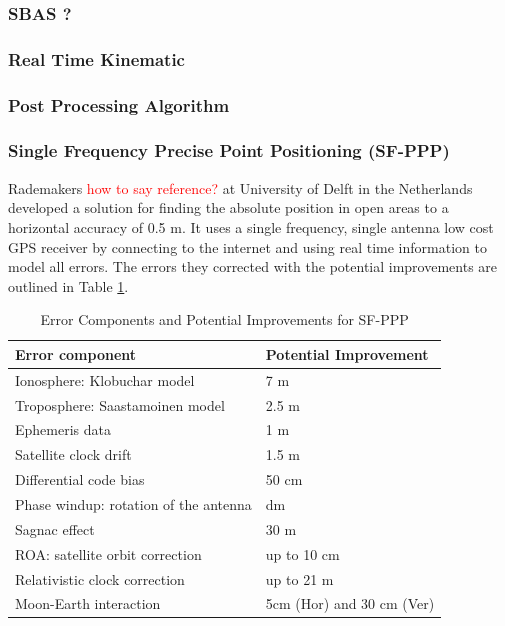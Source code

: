 \documentclass[11pt,a4paper]{article}
\begin{document}
\subsubsection{SBAS  ?}

\subsubsection{Real Time Kinematic}

\subsubsection{Post Processing Algorithm}

\subsubsection{Single Frequency Precise Point Positioning (SF-PPP)}
Rademakers \textcolor{red}{how to say reference?} at University of Delft in the Netherlands developed a solution for finding the absolute position in open areas to a horizontal accuracy of 0.5 m. It uses a single frequency, single antenna low cost GPS receiver by connecting to the internet and using real time information to model all errors. The errors they corrected with the potential improvements are outlined in Table \ref{Table:SFPPP error table}. 
\begin{table}
\centering
\caption{Error Components and Potential Improvements for SF-PPP}
\label{Table:SFPPP error table}
\begin{tabular}{|l|l|}
\hline
\textbf{Error component} &\textbf{ Potential Improvement} \\\hline
 Ionosphere: Klobuchar model & 7 m \\\hline
 Troposphere: Saastamoinen model & 2.5 m \\\hline
Ephemeris data &  1 m \\\hline
 Satellite clock drift & 1.5 m \\\hline
 Differential code bias & 50 cm \\\hline
 Phase windup: rotation of the antenna & dm \\\hline
 Sagnac effect & 30 m \\\hline
 ROA: satellite orbit correction & up to 10 cm \\\hline
 Relativistic clock correction & up to 21 m \\\hline
 Moon-Earth interaction & 5cm (Hor) and 30 cm (Ver)\\\hline
\end{tabular}
\end{table}
\end{document}
